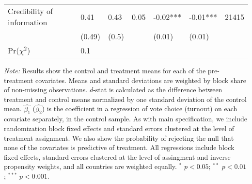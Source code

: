 \begin{table}[h!]
\begin{tabular}{lllllll}
  Credibility of information & 0.41 & 0.43 & 0.05 & -0.02*** & -0.01*** & 21415 \\ 
   & (0.49) & (0.5) &  & (0.01) & (0.01) &  \\ 
\hline Pr($\chi^2$) &0.1&&&&& \\ \hline\hline
\end{tabular}
\begin{flushleft}\textit{Note:} Results show the control and treatment means for each of the pre-treatment covariates. Means and standard deviations are weighted by block share of non-missing observations. $d$-stat is calculated as the difference between treatment and control means normalized by one standard deviation of the control mean. $\hat{\beta_1}$ ($\hat{\beta_2}$) is the coefficient in a regression of vote choice (turnout) on each covariate separately, in the control sample. As with main specification, we include randomization block fixed effects and standard errors clustered at the level of treatment assignment. We also show the probability of rejecting the null that none of the covariates is predictive of treatment. All regressions include block fixed effects, standard errors clustered at the level of assingment and inverse propensity weights, and all countries are weighted equally. $^*$ $p<0.05$; $^{**}$ $p<0.01$; $^{***}$ $p<0.001$. \end{flushleft}
\end{table}
